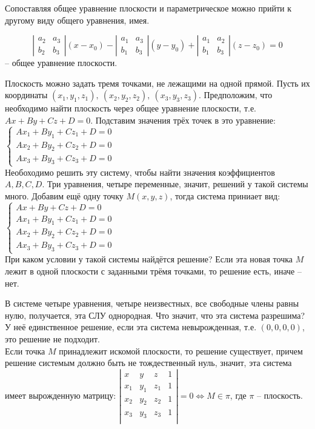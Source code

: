	Сопоставляя общее уравнение плоскости и параметрическое можно прийти к другому виду общего уравнения, имея.

	\begin{Def}
		$$\left|\begin{array}{cccc}
			a_2 & a_3 \\ 
			b_2 & b_3
			\end{array}\right| (x-x_0) - 
		\left|\begin{array}{cccc}
			a_1 & a_3 \\ 
			b_1 & b_3
			\end{array}\right| (y- y_0) + 
		\left|\begin{array}{cccc}
			a_1 & a_2 \\ 
			b_1 & b_3
			\end{array}\right| (z-z_0) = 0$$ -- общее уравнение плоскости.
	\end{Def}

	Плоскость можно задать тремя точками, не лежащими на одной прямой. Пусть их координаты $(x_1, y_1, z_1), \ (x_2, y_2, z_2), \ (x_3, y_3, z_3)$. Предположим, что необходимо найти плоскость через общее уравнение плоскости, т.е. $Ax + By + Cz + D = 0$. Подставим значения трёх точек в это уравнение:
	$ \begin{cases}
		Ax_1 + By_1 + Cz_1 + D = 0\\
		Ax_2 + By_2 + Cz_2 + D = 0\\
		Ax_3 + By_3 + Cz_3 + D = 0
	\end{cases} $ \\
	Необоходимо решить эту систему, чтобы найти значения коэффициентов $A, B, C, D$. Три уравнения, четыре переменные, значит, решений у такой системы много.
	Добавим ещё одну точку $M(x, y, z)$, тогда система приниает вид:
	$ \begin{cases}
		Ax + By + Cz + D = 0 \\
		Ax_1 + By_1 + Cz_1 + D = 0\\
		Ax_2 + By_2 + Cz_2 + D = 0\\
		Ax_3 + By_3 + Cz_3 + D = 0
	\end{cases} $ \\
	При каком условии у такой системы найдётся решение? Если эта новая точка $M$ лежит в одной плоскости с заданными трёмя точками, то решение есть, иначе -- нет.

	В системе четыре уравнения, четыре неизвестных, все свободные члены равны нулю, получается, эта СЛУ однородная. Что значит, что эта система разрешима? У неё единственное решение, если эта система невырожденная, т.е. $(0, 0, 0, 0)$, это решение не подходит. \\
	Если точка $M$ принадлежит искомой плоскости, то решение существует, причем решение системым должно быть не тождественный нуль, значит, эта система имеет вырожденную матрицу:
	$\left|\begin{array}{cccc}
		x & y & z & 1 \\ 
		x_1 & y_1 & z_1 & 1 \\
		x_2 & y_2 & z_2 & 1 \\
		x_3 & y_3 & z_3 & 1 \\
		\end{array}\right| = 0 \Leftrightarrow M \in \pi$, где $\pi$ -- плоскость.

